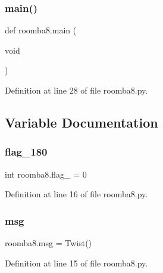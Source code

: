 \subsubsection{\texorpdfstring{main()}{main()}}
{\footnotesize\ttfamily def roomba8.\+main (\begin{DoxyParamCaption}\item[{void}]{ }\end{DoxyParamCaption})}



Definition at line 28 of file roomba8.\+py.



\subsection{Variable Documentation}
\mbox{\label{namespaceroomba8_a2dcb71a7f454c6b24fbde3fa564751c8}} 
\subsubsection{\texorpdfstring{flag\_180}{flag\_180}}
{\footnotesize\ttfamily int roomba8.\+flag\+\_ = 0}



Definition at line 16 of file roomba8.\+py.

\mbox{\label{namespaceroomba8_acbe808bc3ef9fe68480769672ce1ae43}} 
\subsubsection{\texorpdfstring{msg}{msg}}
{\footnotesize\ttfamily roomba8.\+msg = Twist()}



Definition at line 15 of file roomba8.\+py.

